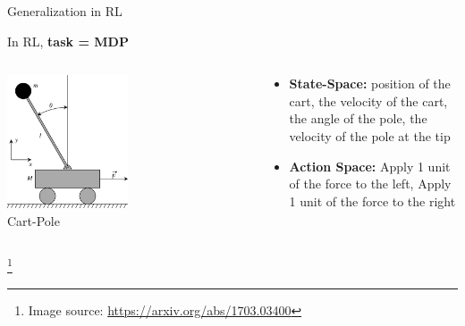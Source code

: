 \documentclass[aspectratio=169]{../latex_main/tntbeamer}  %
\begin{document}
\begin{frame}{Generalization in RL}

    In RL, \textbf{task = MDP}
    
    \begin{columns}
        \begin{center}
            \includegraphics[width=0.5\textwidth]{images/t03/cart-pole.png}\\
            Cart-Pole
            \end{center}
        
        \begin{center}
           \begin{itemize}
               \item \textbf{State-Space:} position of the cart, the velocity of the cart, the angle of the pole, the velocity of the pole at the tip
               \item \textbf{Action Space:} Apply 1 unit of the force to the left, Apply 1 unit of the force to the right
           \end{itemize}
            
        \end{center}
    
    \end{columns}

    \footnote{Image source: \url{https://arxiv.org/abs/1703.03400}}

\end{frame}
\end{document}
